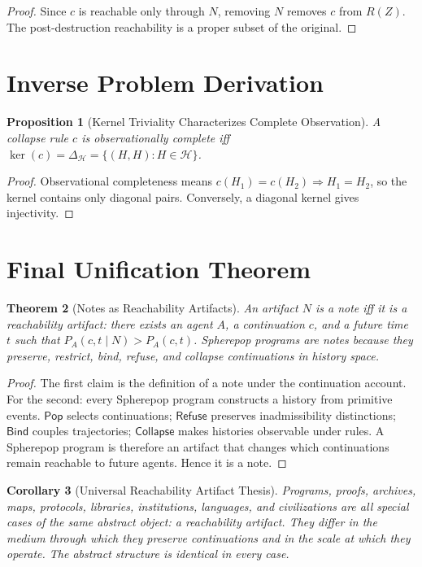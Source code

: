 \documentclass[12pt, a4paper, openany]{book}
\theoremstyle{plain}
\newtheorem{theorem}{Theorem}[chapter]
\newtheorem{proposition}[theorem]{Proposition}
\newtheorem{corollary}[theorem]{Corollary}
\theoremstyle{definition}
\theoremstyle{remark}
\newcommand{\Pop}{\mathsf{Pop}}
\newcommand{\Refuse}{\mathsf{Refuse}}
\newcommand{\Bind}{\mathsf{Bind}}
\newcommand{\Collapse}{\mathsf{Collapse}}
\newcommand{\calH}{\mathcal{H}}
\begin{document}
\begin{proof}
Since $c$ is reachable only through $N$, removing $N$ removes $c$ from $R(Z)$.
The post-destruction reachability is a proper subset of the original.
\end{proof}

\section{Inverse Problem Derivation}

\begin{proposition}[Kernel Triviality Characterizes Complete Observation]
A collapse rule $c$ is observationally complete iff
$\ker(c) = \Delta_\calH = \{(H, H) : H \in \calH\}$.
\end{proposition}

\begin{proof}
Observational completeness means $c(H_1) = c(H_2) \Rightarrow H_1 = H_2$, so
the kernel contains only diagonal pairs. Conversely, a diagonal kernel gives
injectivity.
\end{proof}

\section{Final Unification Theorem}

\begin{theorem}[Notes as Reachability Artifacts]
\label{thm:unification}
An artifact $N$ is a note iff it is a reachability artifact: there exists an
agent $A$, a continuation $c$, and a future time $t$ such that
$P_A(c, t \mid N) > P_A(c, t)$.
Spherepop programs are notes because they preserve, restrict, bind, refuse, and
collapse continuations in history space.
\end{theorem}

\begin{proof}
The first claim is the definition of a note under the continuation account. For
the second: every Spherepop program constructs a history from primitive events.
$\Pop$ selects continuations; $\Refuse$ preserves inadmissibility distinctions;
$\Bind$ couples trajectories; $\Collapse$ makes histories observable under rules.
A Spherepop program is therefore an artifact that changes which continuations
remain reachable to future agents. Hence it is a note.
\end{proof}

\begin{corollary}[Universal Reachability Artifact Thesis]
Programs, proofs, archives, maps, protocols, libraries, institutions, languages,
and civilizations are all special cases of the same abstract object: a reachability
artifact. They differ in the medium through which they preserve continuations and
in the scale at which they operate. The abstract structure is identical in every
case.
\end{corollary}
\end{document}
